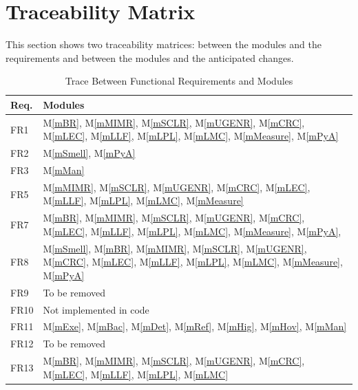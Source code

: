 \documentclass[12pt, titlepage]{article}
\newcommand{\mref}[1]{M\ref{#1}}
\begin{document}
\section{Traceability Matrix} \label{SecTM}

This section shows two traceability matrices: between the modules and the
requirements and between the modules and the anticipated changes.

\begin{table}[H]
  \centering
  \begin{tabular}{p{} p{}}
    \toprule
    \textbf{Req.} & \textbf{Modules}\\
    \midrule
    FR1 & \mref{mBR}, \mref{mMIMR}, \mref{mSCLR}, \mref{mUGENR}, \mref{mCRC}, \mref{mLEC}, \mref{mLLF}, \mref{mLPL}, \mref{mLMC}, \mref{mMeasure}, \mref{mPyA} \\
    FR2 & \mref{mSmell}, \mref{mPyA}\\
    FR3 &     \mref{mMan} \\
    FR5 & \mref{mMIMR}, \mref{mSCLR}, \mref{mUGENR}, \mref{mCRC}, \mref{mLEC}, \mref{mLLF}, \mref{mLPL}, \mref{mLMC}, \mref{mMeasure}\\
    FR7 & \mref{mBR}, \mref{mMIMR}, \mref{mSCLR}, \mref{mUGENR}, \mref{mCRC}, \mref{mLEC}, \mref{mLLF}, \mref{mLPL}, \mref{mLMC}, \mref{mMeasure}, \mref{mPyA},\\
    FR8 & \mref{mSmell}, \mref{mBR}, \mref{mMIMR}, \mref{mSCLR}, \mref{mUGENR}, \mref{mCRC}, \mref{mLEC}, \mref{mLLF}, \mref{mLPL}, \mref{mLMC}, \mref{mMeasure}, \mref{mPyA}\\
    FR9 & To be removed\\
    FR10 & Not implemented in code\\
    FR11 & \mref{mExe}, \mref{mBac}, \mref{mDet}, \mref{mRef}, \mref{mHig}, \mref{mHov}, \mref{mMan}\\
    FR12 & To be removed\\
    FR13 & \mref{mBR}, \mref{mMIMR}, \mref{mSCLR}, \mref{mUGENR}, \mref{mCRC}, \mref{mLEC}, \mref{mLLF}, \mref{mLPL}, \mref{mLMC}\\
    \bottomrule
  \end{tabular}
  \caption{Trace Between Functional Requirements and Modules}
  \label{tab:fr-mod}
\end{table}
\end{document}
